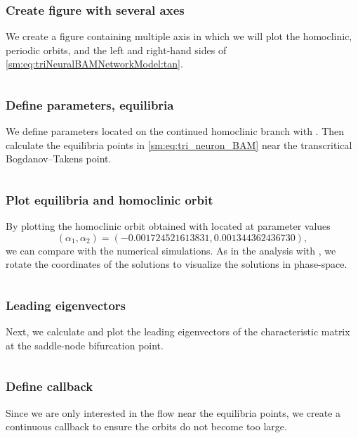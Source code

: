 \subsubsection{Create figure with several axes}
We create a figure containing multiple axis in which we will plot 
the homoclinic, periodic orbits, and the left and right-hand sides
of \cref{sm:eq:triNeuralBAMNetworkModel:tan}.
\inputminted[firstline=79, lastline=89]{julia}{\pathToJuliaFiles/triNeuralBAMNetworkModel_simulation_article.jl}

\subsubsection{Define parameters, equilibria}
We define parameters located on the continued homoclinic branch with
\DDEBIFTOOL. Then calculate the equilibria points in \cref{sm:eq:tri_neuron_BAM}
near the transcritical Bogdanov--Takens point.
\inputminted[firstline=91, lastline=98]{julia}{\pathToJuliaFiles/triNeuralBAMNetworkModel_simulation_article.jl}

\subsubsection{Plot equilibria and homoclinic orbit}
By plotting the homoclinic orbit obtained with \DDEBIFTOOL located at parameter
values 
\[
    (\alpha_1, \alpha_2) = (-0.001724521613831, 0.001344362436730),
\]
we can compare with the numerical simulations. As in the analysis with
\DDEBIFTOOL, we rotate the coordinates of the solutions to visualize the
solutions in phase-space.
\inputminted[firstline=100, lastline=110]{julia}{\pathToJuliaFiles/triNeuralBAMNetworkModel_simulation_article.jl}

\subsubsection{Leading eigenvectors}
Next, we calculate and plot the leading eigenvectors of the characteristic matrix at the saddle-node bifurcation point.
\inputminted[firstline=112, lastline=135]{julia}{\pathToJuliaFiles/triNeuralBAMNetworkModel_simulation_article.jl}

\subsubsection{Define callback}
Since we are only interested in the flow near the equilibria points, we create a
continuous callback to ensure the orbits do not become too large.
\inputminted[firstline=137, lastline=140]{julia}{\pathToJuliaFiles/triNeuralBAMNetworkModel_simulation_article.jl}

